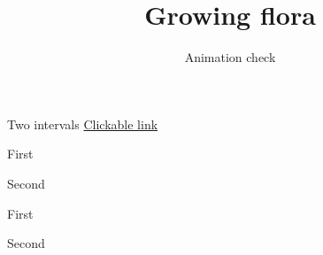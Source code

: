 \documentclass[aspectratio=169]{beamer}
\title{Growing flora}\author{Animation check}\date{}
\begin{document}
\begin{frame}[plain]\titlepage\end{frame}
\begin{frame}{Two intervals}
  \href{https://example.org}{Clickable link}\par
  First\pause\par Second
\end{frame}
\begin{frame}
  First\pause\par Second
\end{frame}
\end{document}
